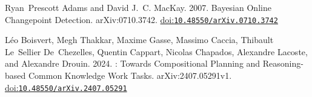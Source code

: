 \documentclass[sigconf,anonymous,review]{acmart}
\theoremstyle{zhplain}
\begin{document}
\begin{thebibliography}{19}


\ifx \showCODEN    \undefined {}     \fi
\ifx \showISBNx    \undefined \def \showISBNx     #1{\unskip}     \fi
\ifx \showISBNxiii \undefined \def \showISBNxiii  #1{\unskip}     \fi
\ifx \showISSN     \undefined \def \showISSN      #1{\unskip}     \fi
\ifx \showLCCN     \undefined \def \showLCCN      #1{\unskip}     \fi
\ifx \shownote     \undefined \def \shownote      #1{#1}          \fi
\ifx \showarticletitle \undefined \def \showarticletitle #1{#1}   \fi
\ifx \showURL      \undefined \def \showURL       {\relax}        \fi
\providecommand\bibfield[2]{#2}
\providecommand\bibinfo[2]{#2}
\providecommand\natexlab[1]{#1}
\providecommand\showeprint[2][]{arXiv:#2}
\makeatletter
{}
\makeatother

\bibfield{author}{\bibinfo{person}{Ryan~Prescott Adams} {and}
  \bibinfo{person}{David J.~C. MacKay}.} \bibinfo{year}{2007}\natexlab{}.
\newblock \bibinfo{title}{Bayesian Online Changepoint Detection}.
\newblock \bibinfo{howpublished}{arXiv:0710.3742}.
\newblock
\href{https://doi.org/10.48550/arXiv.0710.3742}{doi:\nolinkurl{10.48550/arXiv.0710.3742}}


\bibfield{author}{\bibinfo{person}{L{\'e}o Boisvert}, \bibinfo{person}{Megh
  Thakkar}, \bibinfo{person}{Maxime Gasse}, \bibinfo{person}{Massimo Caccia},
  \bibinfo{person}{Thibault Le~Sellier De~Chezelles}, \bibinfo{person}{Quentin
  Cappart}, \bibinfo{person}{Nicolas Chapados}, \bibinfo{person}{Alexandre
  Lacoste}, {and} \bibinfo{person}{Alexandre Drouin}.}
  \bibinfo{year}{2024}\natexlab{}.
\newblock \bibinfo{title}{{WorkArena++}: Towards Compositional Planning and
  Reasoning-based Common Knowledge Work Tasks}.
\newblock \bibinfo{howpublished}{arXiv:2407.05291v1}.
\newblock
\href{https://doi.org/10.48550/arXiv.2407.05291}{doi:\nolinkurl{10.48550/arXiv.2407.05291}}



\end{thebibliography}
\end{document}
